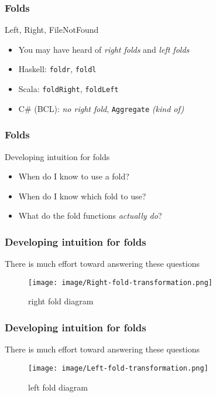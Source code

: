 \begin{frame}
\frametitle{Folds}
\begin{block}{Left, Right, FileNotFound}
\begin{itemize}
\item<1-> You may have heard of \emph{right folds} and \emph{left folds}
\item<2-> Haskell: \lstinline{foldr}, \lstinline{foldl}
\item<2-> Scala: \lstinline{foldRight}, \lstinline{foldLeft}
\item<2-> C\# (BCL): \emph{no right fold}, \lstinline{Aggregate} \emph{(kind of)} 
\end{itemize}
\end{block}
\end{frame}

\begin{frame}
\frametitle{Folds}
\begin{block}{Developing intuition for folds}
\begin{itemize}
\item<1-> When do I know to use a fold?
\item<2-> When do I know which fold to use?
\item<3-> What do the fold functions \emph{actually do}?
\end{itemize}
\end{block}
\end{frame}

\begin{frame}
\frametitle{Developing intuition for folds}
\begin{block}{There is much effort toward answering these questions}
\begin{figure}
\centering
\texttt{[image: image/Right-fold-transformation.png]}
\caption{right fold diagram}
\end{figure}
\end{block}
\end{frame}

\begin{frame}
\frametitle{Developing intuition for folds}
\begin{block}{There is much effort toward answering these questions}
\begin{figure}
\centering
\texttt{[image: image/Left-fold-transformation.png]}
\caption{left fold diagram}
\end{figure}
\end{block}
\end{frame}


